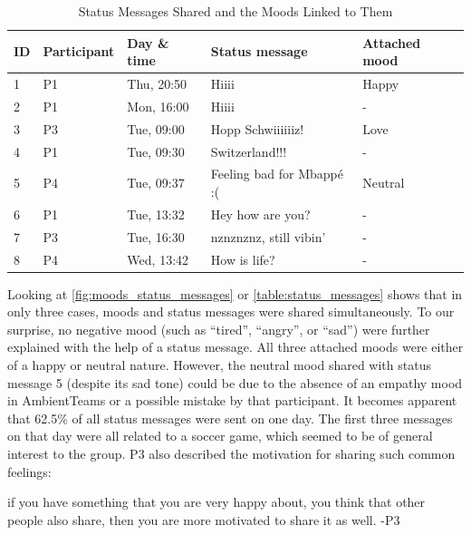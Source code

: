 \begin{table}[h] \footnotesize
    \centering
    \begin{tabularx}{.8\textwidth}{l l l l l}
        \toprule
        ID & Participant & Day \& time    & Status message            & Attached mood \\
        \midrule
        1  & P1          & Thu, 20:50 & Hiiii                     & Happy         \\
        2  & P1          & Mon, 16:00 & Hiiii                     & -             \\
        3  & P3          & Tue, 09:00 & Hopp Schwiiiiiiz!         & Love          \\
        4  & P1          & Tue, 09:30 & Switzerland!!!            & -             \\
        5  & P4          & Tue, 09:37 & Feeling bad for Mbappé :( & Neutral       \\
        6  & P1          & Tue, 13:32 & Hey how are you?          & -             \\
        7  & P3          & Tue, 16:30 & nznznznz, still vibin'    & -             \\
        8  & P4          & Wed, 13:42 & How is life?              & -             \\
        \bottomrule
    \end{tabularx}
    \caption{Status Messages Shared and the Moods Linked to Them}
    \label{table:status_messages}
\end{table}

Looking at \autoref{fig:moods_status_messages} or \autoref{table:status_messages} shows that in only three cases, moods and status messages were shared simultaneously. To our surprise, no negative mood (such as \enquote{tired}, \enquote{angry}, or \enquote{sad}) were further explained with the help of a status message. All three attached moods were either of a happy or neutral nature. However, the neutral mood shared with status message 5 (despite its sad tone) could be due to the absence of an empathy mood in AmbientTeams or a possible mistake by that participant. It becomes apparent that 62.5\% of all status messages were sent on one day. The first three messages on that day were all related to a soccer game, which seemed to be of general interest to the group. P3 also described the motivation for sharing such common feelings:

\begin{displayquote}[][]
    [...] if you have something that you are very happy about, you think that other people also share, then you are more motivated to share it as well. -P3
\end{displayquote}

